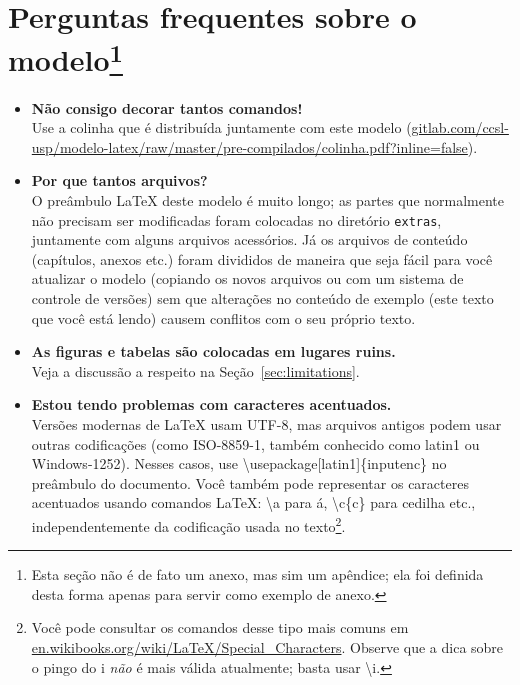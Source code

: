 
\chapter[Perguntas frequentes sobre o modelo]{Perguntas frequentes sobre o modelo\footnote{Esta
seção não é de fato um anexo, mas sim um apêndice; ela foi definida desta
forma apenas para servir como exemplo de anexo.}}

\begin{itemize}

\item \textbf{Não consigo decorar tantos comandos!}\\
Use a colinha que é distribuída juntamente com este modelo (\url{gitlab.com/ccsl-usp/modelo-latex/raw/master/pre-compilados/colinha.pdf?inline=false}).

\item \textbf{Por que tantos arquivos?}\\
O preâmbulo \LaTeX{} deste modelo é muito longo; as partes que normalmente não precisam ser modificadas foram colocadas no diretório \texttt{extras}, juntamente com alguns arquivos acessórios. Já os arquivos de conteúdo (capítulos, anexos etc.) foram divididos de maneira que seja fácil para você atualizar o modelo (copiando os novos arquivos ou com um sistema de controle de versões) sem que alterações no conteúdo de exemplo (este texto que você está lendo) causem conflitos com o seu próprio texto.

\item \textbf{As figuras e tabelas são colocadas em lugares ruins.}\\
Veja a discussão a respeito na Seção~\ref{sec:limitations}.

\item \textbf{Estou tendo problemas com caracteres acentuados.}\\
Versões modernas de \LaTeX{} usam UTF-8, mas arquivos antigos podem usar outras codificações (como ISO-8859-1, também conhecido como latin1 ou Windows-1252). Nesses casos, use \textsf{\textbackslash{}usepackage[latin1]\{inputenc\}} no preâmbulo do documento. Você também pode representar os caracteres acentuados usando comandos \LaTeX{}: \textsf{\textbackslash\textquotesingle{}a} para á, \textsf{\textbackslash{}c\{c\}} para cedilha etc., independentemente da codificação usada no texto\footnote{Você pode consultar os comandos desse tipo mais comuns em \url{en.wikibooks.org/wiki/LaTeX/Special_Characters}. Observe que a dica sobre o pingo do i \emph{não} é mais válida atualmente; basta usar \textsf{\textbackslash\textquotesingle{}i}.}.


\end{itemize}
